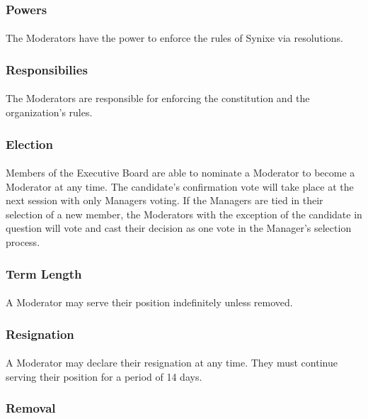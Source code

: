 \documentclass[10pt,a4paper]{article}
\begin{document}
\subsubsection{Powers}
\paragraph{}
The Moderators have the power to enforce the rules of Synixe via resolutions.
\subsubsection{Responsibilies}
\paragraph{}
The Moderators are responsible for enforcing the constitution and the organization's rules.
\subsubsection{Election}
\paragraph{}
Members of the Executive Board are able to nominate a Moderator to become a Moderator at any time. The candidate's confirmation vote will take place at the next session with only Managers voting. If the Managers are tied in their selection of a new member, the Moderators with the exception of the candidate in question will vote and cast their decision as one vote in the Manager's selection process.
\subsubsection{Term Length}
\paragraph{}
A Moderator may serve their position indefinitely unless removed.
\subsubsection{Resignation}
\paragraph{}
A Moderator may declare their resignation at any time. They must continue serving their position for a period of 14 days.
\subsubsection{Removal}
\end{document}
